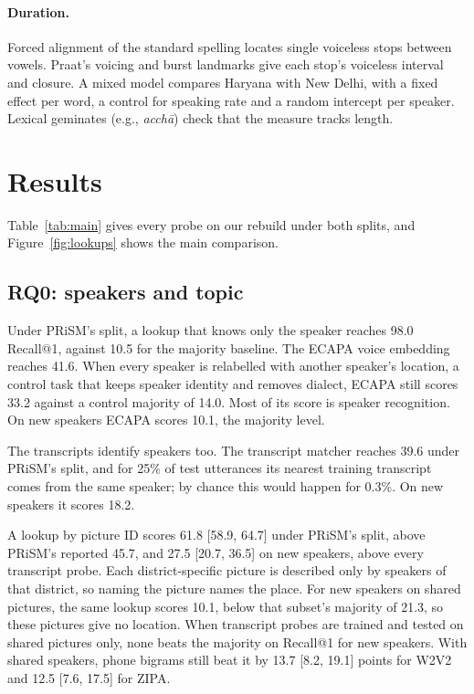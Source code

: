 \documentclass[11pt]{article}
\begin{document}
\paragraph{Duration.} Forced alignment of the standard spelling \citep{pratap2024mms} locates single voiceless
stops between vowels. Praat's voicing and burst landmarks give each stop's voiceless interval and closure. A
mixed model compares Haryana with New Delhi, with a fixed effect per word, a control for speaking rate and a
random intercept per speaker. Lexical geminates (e.g., \textit{acch\=a}) check that the measure tracks length.

\begin{table}[t]
\centering\small

\caption{Test Recall@1 (mean $\pm$ sd over seeds) and mean error in km of the seed ensemble on our rebuild.
BiGRUs have two seeds so far. The picture-ID lookup has no km value because it predicts a pincode, not a point.}
\label{tab:main}
\end{table}

\section{Results}
\label{sec:results}
Table~\ref{tab:main} gives every probe on our rebuild under both splits, and Figure~\ref{fig:lookups} shows the
main comparison.



\subsection{RQ0: speakers and topic}
Under PRiSM's split, a lookup that knows only the speaker reaches 98.0 Recall@1, against 10.5 for the majority
baseline. The ECAPA voice embedding reaches 41.6. When every speaker is relabelled with another speaker's
location, a control task that keeps speaker identity and removes dialect, ECAPA still scores 33.2 against a
control majority of 14.0. Most of its score is speaker recognition. On new speakers ECAPA scores 10.1, the
majority level.

The transcripts identify speakers too. The transcript matcher reaches 39.6 under PRiSM's split, and for 25\% of
test utterances its nearest training transcript comes from the same speaker; by chance this would happen for
0.3\%. On new speakers it scores 18.2.

A lookup by picture ID scores 61.8 [58.9, 64.7] under PRiSM's split, above
PRiSM's reported 45.7, and 27.5 [20.7, 36.5] on new speakers, above every transcript probe. Each
district-specific picture is described only by speakers of that district, so naming the picture names the place. For new speakers on shared pictures, the same
lookup scores 10.1, below that subset's majority of 21.3, so these pictures give no location. When transcript
probes are trained and tested on shared pictures only, none beats the majority on Recall@1 for new speakers.
With shared speakers, phone bigrams still beat it by 13.7 [8.2, 19.1] points for W2V2 and 12.5 [7.6, 17.5] for ZIPA.
\end{document}
